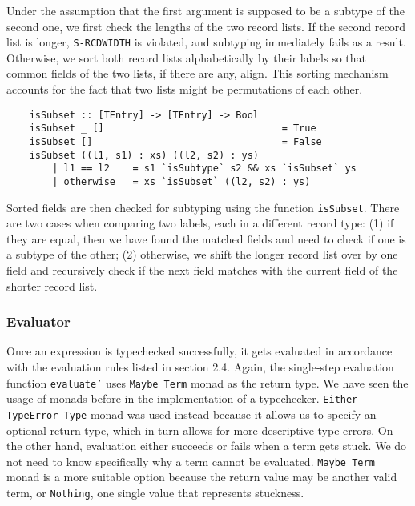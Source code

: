\documentclass[fleqn, 11pt]{article}
\begin{document}
Under the assumption that the first argument is supposed to be a subtype of the second one, we first check the lengths of the two 
record lists. If the second record list is longer, \texttt{S-RCDWIDTH} is violated, and subtyping immediately fails as a result. 
Otherwise, we sort both record lists alphabetically by their labels so that common fields of the two lists, if there are any, align. 
This sorting mechanism accounts for the fact that two lists might be permutations of each other.

\begin{Verbatim}
    isSubset :: [TEntry] -> [TEntry] -> Bool
    isSubset _ []                               = True
    isSubset [] _                               = False
    isSubset ((l1, s1) : xs) ((l2, s2) : ys) 
        | l1 == l2    = s1 `isSubtype` s2 && xs `isSubset` ys
        | otherwise   = xs `isSubset` ((l2, s2) : ys)
\end{Verbatim}

Sorted fields are then checked for subtyping using the function \texttt{isSubset}. There are two cases when comparing two labels, each 
in a different record type: (1) if they are equal, then we have found the matched fields and need to check if one is a subtype of 
the other; (2) otherwise, we shift the longer record list over by one field and recursively check if the next field matches with the 
current field of the shorter record list.

\subsubsection{Evaluator}

Once an expression is typechecked successfully, it gets evaluated in accordance with the evaluation rules listed in section 2.4. 
Again, the single-step evaluation function \texttt{evaluate'} uses \texttt{Maybe Term} monad as the return type. We have seen 
the usage of monads before in the implementation of a typechecker. \texttt{Either TypeError Type} monad was used instead because it allows us 
to specify an optional return type, which in turn allows for more descriptive type errors. On the other hand, evaluation either 
succeeds or fails when a term gets stuck. We do not need to know specifically why a term cannot be evaluated. \texttt{Maybe Term} 
monad is a more suitable option because the return value may be another valid term, or \texttt{Nothing}, one single value that 
represents stuckness.
\end{document}
